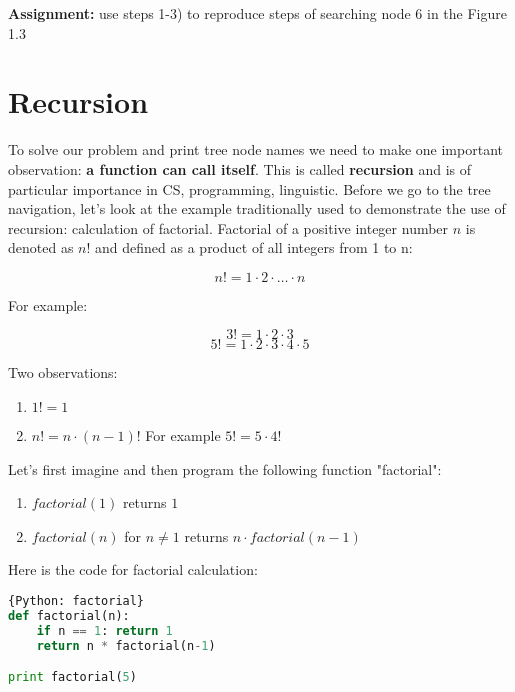 \bigskip
\begin{tcolorbox}
\textbf{Assignment:} use steps 1-3) to reproduce 
steps of searching node 6 in
the Figure 1.3 
\end{tcolorbox}

\section{Recursion}

To solve our problem and print tree node names we need
to make one important observation: \textbf{a function can call itself}.
This is called \textbf{recursion} and is of particular importance in
CS, programming, linguistic. Before we go to the tree navigation,
let's look at the example traditionally used to demonstrate
the use of recursion: calculation of factorial. Factorial of a
positive integer number $n$
is denoted as $n!$ and defined as a product of all integers
from 1 to n:

$$n! = 1 \cdot 2 \cdot\dots\cdot n$$

For example:

$$3! = 1\cdot 2\cdot 3$$
$$5! = 1\cdot 2\cdot 3\cdot 4\cdot 5$$

Two observations:

\begin{leftborder}
\begin{enumerate}
\item $1! = 1$
\item $n! = n\cdot (n-1)!$ For example $5! = 5\cdot 4!$
\end{enumerate}
\end{leftborder}

Let's first imagine and then program the following function "factorial":

\begin{leftborder}
\begin{enumerate}
\item $factorial(1)$ returns $1$
\item $factorial(n)$ for $n\neq 1$ returns $n\cdot factorial(n-1)$
\end{enumerate}
\end{leftborder}


Here is the code for factorial calculation:
\begin{lstlisting}[style=codelst,language=Python]{Python: factorial}
def factorial(n):
    if n == 1: return 1
    return n * factorial(n-1)

print factorial(5)
\end{lstlisting}

